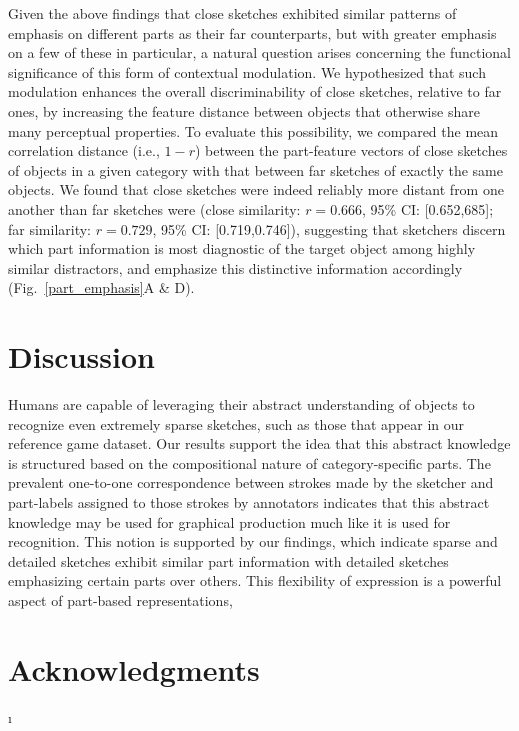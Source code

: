 \documentclass[10pt,letterpaper]{article}
\begin{document}
Given the above findings that close sketches exhibited similar patterns of emphasis on different parts as their far counterparts, but with greater emphasis on a few of these in particular, a natural question arises concerning the functional significance of this form of contextual modulation. 
We hypothesized that such modulation enhances the overall discriminability of close sketches, relative to far ones, by increasing the feature distance between objects that otherwise share many perceptual properties. 
To evaluate this possibility, we compared the mean correlation distance (i.e., $1 - r$) between the part-feature vectors of close sketches of objects in a given category with that between far sketches of exactly the same objects. 
We found that close sketches were indeed reliably more distant from one another than far sketches were (close similarity: $r = 0.666$, 95\% CI: [0.652,685]; far similarity: $r = 0.729$, 95\% CI: [0.719,0.746]), suggesting that sketchers discern which part information is most diagnostic of the target object among highly similar distractors, and emphasize this distinctive information accordingly (Fig.~\ref{part_emphasis}A \& D).

\section{Discussion}

Humans are capable of leveraging their abstract understanding of objects to recognize even extremely sparse sketches, such as those that appear in our reference game dataset. Our results support the idea that this abstract knowledge is structured based on the compositional nature of category-specific parts. The prevalent one-to-one correspondence between strokes made by the sketcher and part-labels assigned to those strokes by annotators indicates that this abstract knowledge may be used for graphical production much like it is used for recognition.
This notion is supported by our findings, which indicate sparse and detailed sketches exhibit similar part information with detailed sketches emphasizing certain parts over others. This flexibility of expression is a powerful aspect of part-based representations, 

\section{Acknowledgments}





\setlength{\bibleftmargin}{.125in}
\setlength{\bibindent}{-\bibleftmargin}ı
\end{document}
